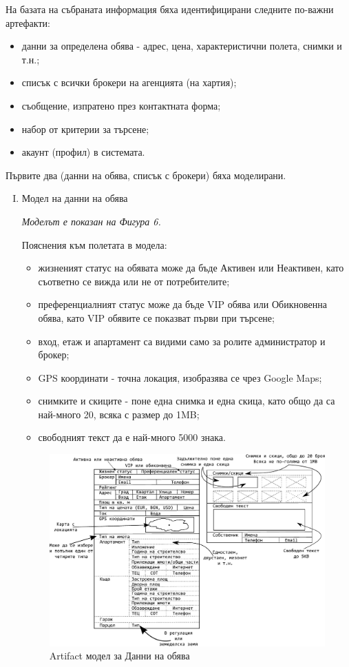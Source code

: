 \documentclass[]{article}
\begin{document}
На базата на събраната информация бяха идентифицирани следните по-важни артефакти:
\begin{itemize}
	\item данни за определена обява - адрес, цена, характеристични полета, снимки и т.н.;
	\item списък с всички брокери на агенцията (на хартия);
	\item съобщение, изпратено през контактната форма;
	\item набор от критерии за търсене;
	\item акаунт (профил) в системата.
\end{itemize}

Първите два (данни на обява, списък с брокери) бяха моделирани.

\begin{enumerate}[I.]
	\item {Модел на данни на обява
		
		\emph{Моделът е показан на Фигура 6.} 
		
		Пояснения към полетата в модела:
		\begin{itemize}
		\item жизненият статус на обявата може да бъде Активен или Неактивен, като съответно се вижда или не от потребителите;
		\item преференциалният статус може да бъде VIP обява или Обикновенна обява, като VIP обявите се показват първи при търсене;
		\item вход, етаж и апартамент са видими само за ролите администратор и брокер;
		\item GPS координати - точна локация, изобразява се чрез Google Maps;
		\item снимките и скиците - поне една снимка и една скица, като общо да са най-много 20, всяка с размер до 1MB;
		\item свободният текст да е най-много 5000 знака.
		\end{itemize}

	\begin{figure}[h]
	\centering
	\includegraphics[scale=0.85]{art-offer}
	\caption{Artifact модел за Данни на обява}
	\end{figure}
	
}
\end{enumerate}
\end{document}
